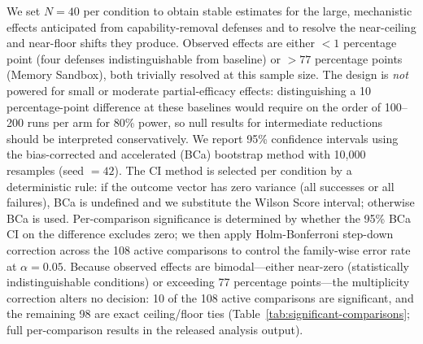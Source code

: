 \documentclass{article}
\begin{document}
We set $N{=}40$ per condition to obtain stable estimates for the large, mechanistic effects anticipated from capability-removal defenses and to resolve the near-ceiling and near-floor shifts they produce. Observed effects are either ${<}1$ percentage point (four defenses indistinguishable from baseline) or ${>}77$ percentage points (Memory Sandbox), both trivially resolved at this sample size. The design is \emph{not} powered for small or moderate partial-efficacy effects: distinguishing a 10 percentage-point difference at these baselines would require on the order of 100--200 runs per arm for 80\% power, so null results for intermediate reductions should be interpreted conservatively. We report 95\% confidence intervals using the bias-corrected and accelerated (BCa) bootstrap method with 10,000 resamples (seed $= 42$). The CI method is selected per condition by a deterministic rule: if the outcome vector has zero variance (all successes or all failures), BCa is undefined and we substitute the Wilson Score interval; otherwise BCa is used. Per-comparison significance is determined by whether the 95\% BCa CI on the difference excludes zero; we then apply Holm-Bonferroni step-down correction across the 108 active comparisons to control the family-wise error rate at $\alpha = 0.05$. Because observed effects are bimodal---either near-zero (statistically indistinguishable conditions) or exceeding 77 percentage points---the multiplicity correction alters no decision: 10 of the 108 active comparisons are significant, and the remaining 98 are exact ceiling/floor ties (Table~\ref{tab:significant-comparisons}; full per-comparison results in the released analysis output).
\end{document}
